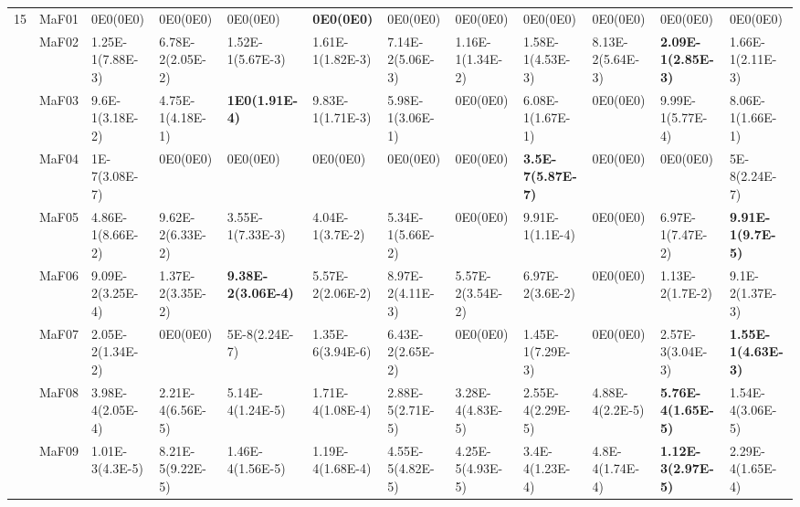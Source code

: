 \documentclass[]{article}
\begin{document}
\begin{landscape}
\begin{table}
\begin{footnotesize}
\begin{tabular}{|l|l|l|l|l|l|l|l|l|l|l|l|}
\multirow{15}{*}{15} & MaF01 & \cellcolor{gray95} 0E0(0E0) & \cellcolor{gray95} 0E0(0E0) & \cellcolor{gray95} 0E0(0E0) & \cellcolor{gray95} {\bf 0E0(0E0)} & \cellcolor{gray95} 0E0(0E0) & \cellcolor{gray95} 0E0(0E0) & \cellcolor{gray95} 0E0(0E0) & \cellcolor{gray95} 0E0(0E0) & \cellcolor{gray95} 0E0(0E0) & \cellcolor{gray95} 0E0(0E0)\\
 & MaF02 & 1.25E-1(7.88E-3) & 6.78E-2(2.05E-2) & 1.52E-1(5.67E-3) & \cellcolor{gray95} 1.61E-1(1.82E-3) & 7.14E-2(5.06E-3) & 1.16E-1(1.34E-2) & \cellcolor{gray95} 1.58E-1(4.53E-3) & 8.13E-2(5.64E-3) & \cellcolor{gray95} {\bf 2.09E-1(2.85E-3)} & \cellcolor{gray95} 1.66E-1(2.11E-3)\\
 & MaF03 & 9.6E-1(3.18E-2) & 4.75E-1(4.18E-1) & \cellcolor{gray95} {\bf 1E0(1.91E-4)} & \cellcolor{gray95} 9.83E-1(1.71E-3) & 5.98E-1(3.06E-1) & 0E0(0E0) & 6.08E-1(1.67E-1) & 0E0(0E0) & \cellcolor{gray95} 9.99E-1(5.77E-4) & 8.06E-1(1.66E-1)\\
 & MaF04 & \cellcolor{gray95} 1E-7(3.08E-7) & \cellcolor{gray95} 0E0(0E0) & \cellcolor{gray95} 0E0(0E0) & \cellcolor{gray95} 0E0(0E0) & \cellcolor{gray95} 0E0(0E0) & \cellcolor{gray95} 0E0(0E0) & \cellcolor{gray95} {\bf 3.5E-7(5.87E-7)} & \cellcolor{gray95} 0E0(0E0) & \cellcolor{gray95} 0E0(0E0) & \cellcolor{gray95} 5E-8(2.24E-7)\\
 & MaF05 & 4.86E-1(8.66E-2) & 9.62E-2(6.33E-2) & 3.55E-1(7.33E-3) & 4.04E-1(3.7E-2) & \cellcolor{gray95} 5.34E-1(5.66E-2) & 0E0(0E0) & \cellcolor{gray95} 9.91E-1(1.1E-4) & 0E0(0E0) & \cellcolor{gray95} 6.97E-1(7.47E-2) & \cellcolor{gray95} {\bf 9.91E-1(9.7E-5)}\\
 & MaF06 & \cellcolor{gray95} 9.09E-2(3.25E-4) & 1.37E-2(3.35E-2) & \cellcolor{gray95} {\bf 9.38E-2(3.06E-4)} & 5.57E-2(2.06E-2) & \cellcolor{gray95} 8.97E-2(4.11E-3) & 5.57E-2(3.54E-2) & 6.97E-2(3.6E-2) & 0E0(0E0) & 1.13E-2(1.7E-2) & \cellcolor{gray95} 9.1E-2(1.37E-3)\\
 & MaF07 & \cellcolor{gray95} 2.05E-2(1.34E-2) & 0E0(0E0) & 5E-8(2.24E-7) & 1.35E-6(3.94E-6) & \cellcolor{gray95} 6.43E-2(2.65E-2) & 0E0(0E0) & \cellcolor{gray95} 1.45E-1(7.29E-3) & 0E0(0E0) & 2.57E-3(3.04E-3) & \cellcolor{gray95} {\bf 1.55E-1(4.63E-3)}\\
 & MaF08 & 3.98E-4(2.05E-4) & 2.21E-4(6.56E-5) & \cellcolor{gray95} 5.14E-4(1.24E-5) & 1.71E-4(1.08E-4) & 2.88E-5(2.71E-5) & 3.28E-4(4.83E-5) & 2.55E-4(2.29E-5) & \cellcolor{gray95} 4.88E-4(2.2E-5) & \cellcolor{gray95} {\bf 5.76E-4(1.65E-5)} & 1.54E-4(3.06E-5)\\
 & MaF09 & \cellcolor{gray95} 1.01E-3(4.3E-5) & 8.21E-5(9.22E-5) & 1.46E-4(1.56E-5) & 1.19E-4(1.68E-4) & 4.55E-5(4.82E-5) & 4.25E-5(4.93E-5) & 3.4E-4(1.23E-4) & \cellcolor{gray95} 4.8E-4(1.74E-4) & \cellcolor{gray95} {\bf 1.12E-3(2.97E-5)} & 2.29E-4(1.65E-4)\\

\end{tabular}
\end{footnotesize}
\end{table}
\end{landscape}
\end{document}
